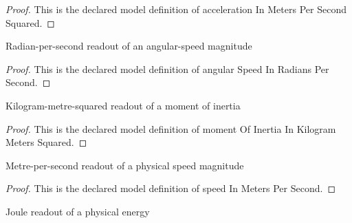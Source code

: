 \begin{proof}
  This is the declared model definition of acceleration In Meters Per Second Squared.
\end{proof}
\begin{definition}
  \label{def:physics:phyx-mini-0699:phyxminiproblems-problemphyxmini0699-angularspeedinradianspersecond}
  Radian-per-second readout of an angular-speed magnitude
\end{definition}
\begin{proof}
  This is the declared model definition of angular Speed In Radians Per Second.
\end{proof}
\begin{definition}
  \label{def:physics:phyx-mini-0699:phyxminiproblems-problemphyxmini0699-momentofinertiainkilogrammeterssquared}
  Kilogram-metre-squared readout of a moment of inertia
\end{definition}
\begin{proof}
  This is the declared model definition of moment Of Inertia In Kilogram Meters Squared.
\end{proof}
\begin{definition}
  \label{def:physics:phyx-mini-0699:phyxminiproblems-problemphyxmini0699-speedinmeterspersecond}
  Metre-per-second readout of a physical speed magnitude
\end{definition}
\begin{proof}
  This is the declared model definition of speed In Meters Per Second.
\end{proof}
\begin{definition}
  \label{def:physics:phyx-mini-0699:phyxminiproblems-problemphyxmini0699-energyinjoules}
  Joule readout of a physical energy
\end{definition}
